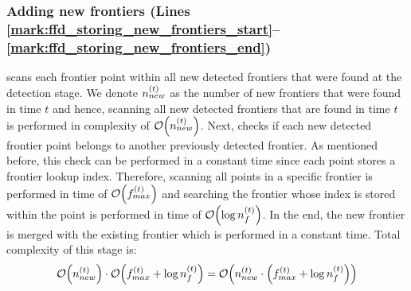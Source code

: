 \subsubsection{Adding new frontiers (Lines
\ref{mark:ffd_storing_new_frontiers_start}--\ref{mark:ffd_storing_new_frontiers_end})}
\FFD scans each frontier point within all new detected frontiers that were found
at the detection stage. We denote $n_{new}^{\left(t\right)}$ as the number of new
frontiers that were found in time $t$ and hence, scanning all new detected
frontiers that are found in time $t$ is performed in complexity of
$\mathcal{O}{\left(n_{new}^{\left(t\right)}\right)}$. Next, \FFD checks if each new detected frontier
point belongs to another previously detected frontier. As mentioned before, this
check can be performed in a constant time since each point stores a frontier
lookup index. Therefore, scanning all points in a specific frontier is performed
in time of $\mathcal{O}{\left(f_{max}^{\left(t\right)}\right)}$ and searching the frontier whose index
is stored within the point is performed in time of
$\mathcal{O}{\left(\log{n_f^{\left(t\right)}}\right)}$. In the end, the new frontier is merged with the
existing frontier which is performed in a constant time. Total complexity of
this stage is:
\begin{equation}\label{eq:add_new_frontiers}
	\mathcal{O}{\left(n_{new}^{\left(t\right)}\right)} \cdot
  	\mathcal{O}{\left(f_{max}^{\left(t\right)} + \log{n_f^{\left(t\right)}} \right)} 
  	=
  	\mathcal{O}{\left(n_{new}^{\left(t\right)} \cdot 
  		{\left(f_{max}^{\left(t\right)} + \log{n_f^{\left(t\right)}}\right)}\right)}
\end{equation}


